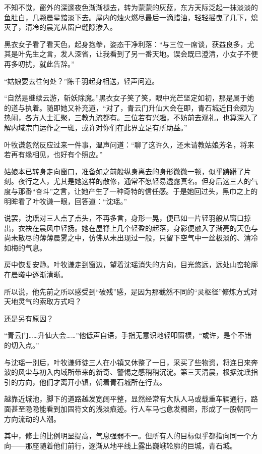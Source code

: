 不知不觉，窗外的深邃夜色渐渐褪去，转为蒙蒙的灰蓝，东方天际泛起一抹淡淡的鱼肚白，几颗晨星黯淡下去。屋内的烛火燃尽最后一滴蜡油，轻轻摇曳了几下，熄灭了，清冷的晨光从窗户缝隙渗入。

黑衣女子看了看天色，起身抱拳，姿态干净利落：“与三位一席谈，获益良多，尤其是叶先生之言，发人深省，让我看到了另一番天地。误会既已澄清，小女子不便再多叨扰，就此告辞。”

“姑娘要去往何处？”陈千羽起身相送，轻声问道。

“自然是继续云游，斩妖除魔。”黑衣女子笑了笑，眼中光芒坚定如初，那是属于她的道与执着。随即她又补充道，“对了，青云门升仙大会在即，青石城近日会颇为热闹，各方人士汇聚，三教九流都有。三位若有兴趣，不妨前去观礼，也算深入了解内域宗门运作之一斑，或许对你们在此界立足有所助益。”

叶牧谦忽然反应过来一件事，温声问道：“聊了这许久，还未请教姑娘芳名，将来若再有缘相见，也好有个照应。”

姑娘本已转身走向窗口，准备如之前般纵身离去的身形微微一顿，似乎踌躇了片刻。夜行之人，尤其是她这样的散修，通常不愿轻易透露真名。但身后这三人的气度与那番“奋斗”之言，让她产生了一种奇特的信任感。于是她回过头，黑巾之上的明眸看了叶牧谦一眼，回答道：“沈瑶。”

说罢，沈瑶对三人点了点头，不再多言，身形一晃，便已如一片轻羽般从窗口掠出，衣袂在晨风中轻扬。她在屋脊上几个轻盈的起落，身影便融入了渐亮的天色与尚未散尽的薄薄晨雾之中，仿佛从未出现过一般，只留下空气中一丝极淡的、清冷如梅的气息。

房中恢复安静。叶牧谦走到窗边，望着沈瑶消失的方向，目光悠远，远处山峦轮廓在晨曦中逐渐清晰。

所以说，他先前之所以感受到“破残”感，是因为那截然不同的“灵枢径”修炼方式对天地灵气的索取方式吗？

还是另有原因？

“青云门……升仙大会……”他低声自语，手指无意识地轻叩窗棂，“或许，是个不错的切入点。”

\vspace{2em}

与沈瑶一别后，叶牧谦师徒三人在小镇又休整了一日，采买了些物资，将连日来奔波的风尘与初入内域所带来的新奇、警惕之感稍稍沉淀。第三天清晨，根据沈瑶指引的方向，他们才离开小镇，朝着青石城所在行去。

越靠近城池，脚下的道路越发宽阔平整，显然经常有大队人马或载重车辆通行，路面甚至隐隐能看到加固符文的浅淡痕迹。行人车马也愈发稠密，形成了一股朝同一方向流动的人潮。

其中，修士的比例明显提高，气息强弱不一。但所有人的目标似乎都指向同一个方向——那座随着他们前行，逐渐从地平线上露出巍峨轮廓的巨城，青石城。

